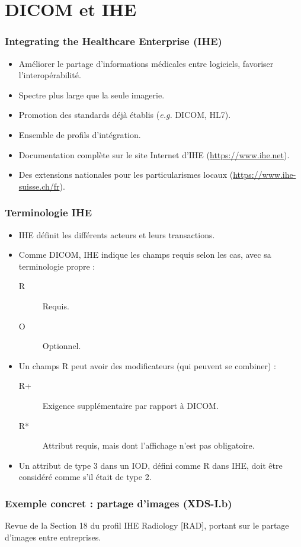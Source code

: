 \section{DICOM et IHE}

 \frame
 {
 	\frametitle{Integrating the Healthcare Enterprise (IHE)}
	
	\begin{itemize} 	 	
		\item Am\'eliorer le partage d'informations m\'edicales entre logiciels, favoriser l'interop\'erabilit\'e.
		\item Spectre plus large que la seule imagerie.
		\item Promotion des standards d\'ej\`a \'etablis (\emph{e.g.} DICOM, HL7).
		\item Ensemble de profils d'int\'egration.
		\item Documentation compl\`ete sur le site Internet d'IHE (\url{https://www.ihe.net}).
		\item Des extensions nationales pour les particularismes locaux (\url{https://www.ihe-suisse.ch/fr}).
	\end{itemize}

 }

\frame
 {
 	\frametitle{Terminologie IHE}
	
	\begin{itemize}
		\item IHE d\'efinit les diff\'erents acteurs et leurs transactions.
		\item Comme DICOM, IHE indique les champs requis selon les cas, avec sa terminologie propre :	
		\begin{description}
			\item[R] Requis.
			\item[O] Optionnel.
		\end{description}
		\item Un champs R peut avoir des modificateurs (qui peuvent se combiner) :
		\begin{description}
			\item[R+] 	Exigence suppl\'ementaire par rapport \`a DICOM.
			\item[R*] Attribut requis, mais dont l'affichage n'est pas obligatoire.
		\end{description}
		\item Un attribut de type 3 dans un IOD, d\'efini comme R dans IHE, doit \^etre consid\'er\'e comme s'il \'etait de type 2.
	\end{itemize}
	
 }

\frame
 {
 	\frametitle{Exemple concret : partage d'images (XDS-I.b)}
	Revue de la Section 18 du profil IHE Radiology [RAD], portant sur le partage d'images entre entreprises.
 }
